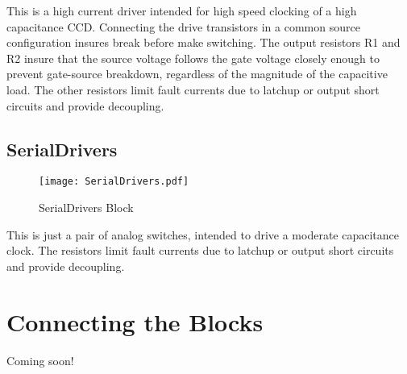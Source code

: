 \documentclass[a4paper,12pt]{article}
\begin{document}
This is a high current driver intended for high speed clocking of a high capacitance CCD. Connecting the drive transistors in a common source configuration insures break before make switching. The output resistors R1 and R2 insure that the source voltage follows the gate voltage closely enough to prevent gate-source breakdown, regardless of the magnitude of the capacitive load. The other resistors limit fault currents due to latchup or output short circuits and provide decoupling.

\subsection{SerialDrivers}
   \begin{figure}
   \begin{center}
   \texttt{[image: SerialDrivers.pdf]}
   \end{center}
   \caption{SerialDrivers Block}
   \end{figure}
   
This is just a pair of analog switches, intended to drive a moderate capacitance clock. The resistors limit fault currents due to latchup or output short circuits and provide decoupling.

\section{Connecting the Blocks}

Coming soon!
\end{document}
